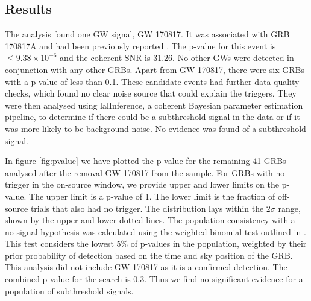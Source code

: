 \documentclass[11pt]{cuthesis}
\begin{document}
\subsection{Results}
The analysis found one GW signal, GW 170817. It was associated with GRB 170817A and had been previously reported \cite{GW170817_det}\cite{GW170817_GRB}. The p-value for this event is $\leq 9.38 \times 10^{-6}$ and the coherent SNR is 31.26\cite{o2grb}. No other GWs were detected in conjunction with any other GRBs. Apart from GW 170817, there were six GRBs with a p-value of less than 0.1. These candidate events had further data quality checks, which found no clear noise source that could explain the triggers. They were then analysed using lalInference\cite{Veitch:2008ur}, a coherent Bayesian parameter estimation pipeline, to determine if there could be a subthreshold signal in the data or if it was more likely to be background noise. No evidence was found of a subthreshold signal. 

In figure \ref{fig:pvalue} we have plotted the p-value for the remaining 41 GRBs analysed after the removal GW 170817 from the sample. For GRBs with no trigger in the on-source window, we provide upper and lower limits on the p-value. The upper limit is a p-value of 1. The lower limit is the fraction of off-source trials that also had no trigger. The distribution lays within the $2\sigma$ range, shown by the upper and lower dotted lines. The population consistency with a no-signal hypothesis was calculated using the weighted binomial test outlined in \cite{abadie}. This test considers the lowest $5\%$ of p-values in the population, weighted by their prior probability of detection based on the time and sky position of the GRB. This analysis did not include GW 170817 as it is a confirmed detection. The combined p-value for the search is 0.3. Thus we find no significant evidence for a population of subthreshold signals.  
\end{document}
